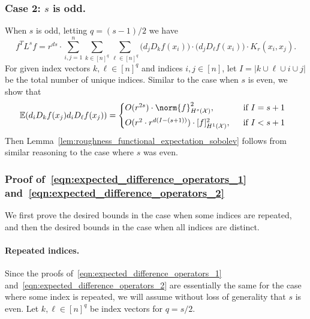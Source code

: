 \documentclass{article}
\newcommand{\abs}[1]{\left \lvert #1 \right \rvert}
\newcommand{\1}{\mathbf{1}}
\newcommand{\Xset}{\mathcal{X}}
\newcommand{\Ebb}{\mathbb{E}}
\theoremstyle{alden}
\theoremstyle{aldenthm}
\theoremstyle{definition}
\theoremstyle{remark}
\begin{document}
\subsubsection{Case 2: $s$ is odd.}
When $s$ is odd, letting $q = (s - 1)/2$ we have
\begin{equation}
\label{eqn:roughness_functional_representation_odd}
f^T L^s f =  r^{ds} \cdot \sum_{i,j = 1}^{n} \sum_{k \in [n]^q} \sum_{\ell \in [n]^q} \bigl(d_jD_kf(x_i)\bigr) \cdot  \bigl(d_jD_{\ell}f(x_i)\bigr) \cdot K_r(x_i,x_j).
\end{equation}
For given index vectors $k,\ell \in [n]^q$ and indices $i,j \in [n]$, let $I = \abs{k \cup \ell \cup i \cup j}$ be the total number of unique indices. Similar to the case when $s$ is even, we show that 
\begin{equation}
\label{eqn:expected_difference_operators_2}
\Ebb(d_iD_kf(x_j) d_iD_\ell f(x_j)) =
\begin{cases*}
O(r^{2s}) \cdot \norm{f}_{H^s(\Xset)}^2, & ~~\textrm{if $I = s + 1$} \\
O(r^{2} \cdot r^{d(I - (s + 1))}) \cdot [f]_{H^1(\Xset)}^2, & ~~\textrm{if $I < s + 1$}~ 
\end{cases*}
\end{equation}
Then Lemma~\ref{lem:roughness_functional_expectation_sobolev} follows from similar reasoning to the case where $s$ was even.

\subsubsection{Proof of~\eqref{eqn:expected_difference_operators_1} and~\eqref{eqn:expected_difference_operators_2}}
\label{subsec:expected_difference_operators_pf}

We first prove the desired bounds in the case when some indices are repeated, and then the desired bounds in the case when all indices are distinct. 

\paragraph{Repeated indices.}

Since the proofs of~\eqref{eqn:expected_difference_operators_1} and~\eqref{eqn:expected_difference_operators_2} are essentially the same for the case where some index is repeated, we will assume without loss of generality that $s$ is even. Let $k,\ell \in [n]^q$ be index vectors for $q = s/2$. 
\end{document}
